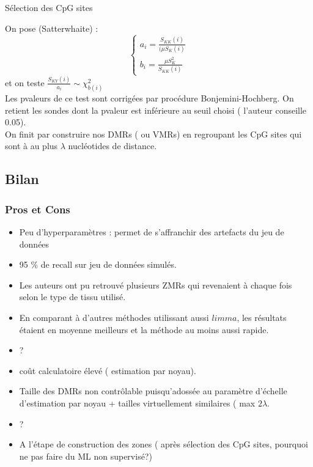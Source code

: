 \documentclass{beamer}
\begin{document}
\begin{frame}{Sélection des CpG sites}

On pose (Satterwhaite) :
\begin{equation}
\left\lbrace
\begin{array}{ccc}
a_{i} = \frac{S_{KK}(i)}{ (\mu S_{K}(i)} \\
b_{i} = \frac{\mu S^2_{K}}{S_{KK}(i)}
\end{array}\right.
\end{equation}
et on teste $\frac{S_{KY}(i)}{a_{i}} \sim \chi^2_{b(i)}$ \\
Les pvaleurs de ce test sont corrigées par procédure Bonjemini-Hochberg.  On retient les sondes dont la pvaleur est inférieure au seuil choisi ( l'auteur conseille 0.05). \\
On finit par construire nos DMRs ( ou VMRs) en regroupant les CpG sites qui sont à au plus $\lambda$ nucléotides de distance.
\end{frame}


\subsection{Bilan}
\begin{frame}
\frametitle{Pros et Cons}


\begin{itemize}
\color{green}
\item Peu d'hyperparamètres : permet de s'affranchir des artefacts du jeu de données
\item 95 \% de recall sur jeu de données simulés.
\item Les auteurs ont pu retrouvé plusieurs ZMRs qui revenaient à chaque fois selon le type de tissu utilisé.
\item En comparant à d'autres méthodes utilissant aussi $limma$, les résultats étaient en moyenne meilleurs et la méthode au moins aussi rapide.
\item ?

\color{red}
\item coût calculatoire élevé ( estimation par noyau).
\item Taille des DMRs non contrôlable puisqu'adossée au paramètre d'échelle d'estimation par noyau + tailles virtuellement similaires ( max $2\lambda$.
\item ?

\color{black}
\item A l'étape de construction des zones ( après sélection des CpG sites, pourquoi ne pas faire du ML non supervisé?)
\end{itemize}
\end{frame}
\end{document}
